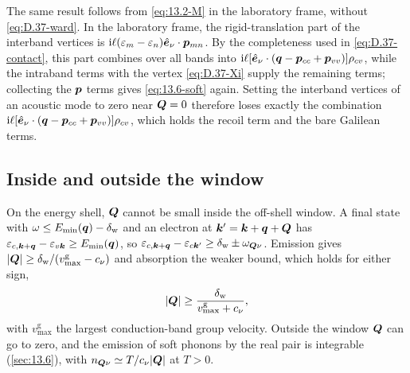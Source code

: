 The same result follows from \cref{eq:13.2-M} in the laboratory frame, without \cref{eq:D.37-ward}. In the laboratory frame, the rigid-translation part of the interband vertices is $\mathrm{i}\ell(\varepsilon_m - \varepsilon_n)\hat{\bm{e}}_\nu\cdot\bm{p}_{mn}$. By the completeness used in \cref{eq:D.37-contact}, this part combines over all bands into $\mathrm{i}\ell[\hat{\bm{e}}_\nu\cdot(\bm{q} - \bm{p}_{cc} + \bm{p}_{vv})]\rho_{cv}$, while the intraband terms with the vertex \cref{eq:D.37-Xi} supply the remaining terms; collecting the $\bm{p}$ terms gives \cref{eq:13.6-soft} again. Setting the interband vertices of an acoustic mode to zero near $\bm{Q} = 0$ therefore loses exactly the combination $\mathrm{i}\ell[\hat{\bm{e}}_\nu\cdot(\bm{q} - \bm{p}_{cc} + \bm{p}_{vv})]\rho_{cv}$, which holds the recoil term and the bare Galilean terms.

\subsection*{Inside and outside the window}

On the energy shell, $\bm{Q}$ cannot be small inside the off-shell window. A final state with $\omega \le E_{\mathrm{min}}(\bm{q}) - \delta_{\mathrm{w}}$ and an electron at $\bm{k}' = \bm{k}+\bm{q}+\bm{Q}$ has $\varepsilon_{c,\bm{k}+\bm{q}} - \varepsilon_{v\bm{k}} \ge E_{\mathrm{min}}(\bm{q})$, so $\varepsilon_{c,\bm{k}+\bm{q}} - \varepsilon_{c\bm{k}'} \ge \delta_{\mathrm{w}} \pm \omega_{\bm{Q}\nu}$. Emission gives $|\bm{Q}| \ge \delta_{\mathrm{w}}/(v^{\mathrm{g}}_{\max} - c_\nu)$ and absorption the weaker bound, which holds for either sign,
\begin{equation}
  |\bm{Q}| \ge \frac{\delta_{\mathrm{w}}}{v^{\mathrm{g}}_{\max} + c_\nu} ,
  \label{eq:D.37-Qmin}
\end{equation}
with $v^{\mathrm{g}}_{\max}$ the largest conduction-band group velocity. Outside the window $\bm{Q}$ can go to zero, and the emission of soft phonons by the real pair is integrable (\cref{sec:13.6}), with $n_{\bm{Q}\nu} \simeq T/c_\nu|\bm{Q}|$ at $T > 0$.
